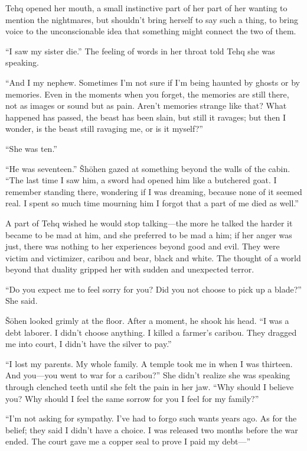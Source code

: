 Tehq opened her mouth, a small instinctive part of her part of her wanting to mention the nightmares, but shouldn't bring herself to say such a thing, to bring voice to the unconscionable idea that something might connect the two of them.

``I saw my sister die.'' The feeling of words in her throat told Tehq she was speaking.

``And I my nephew. Sometimes I'm not sure if I'm being haunted by ghosts or by memories. Even in the moments when you forget, the memories are still there, not as images or sound but as pain. Aren't memories strange like that? What happened has passed, the beast has been slain, but still it ravages; but then I wonder, is the beast still ravaging me, or is it myself?''

``She was ten.''

``He was seventeen.'' Šhōhen gazed at something beyond the walls of the cabin. ``The last time I saw him, a sword had opened him like a butchered goat. I remember standing there, wondering if I was dreaming, because none of it seemed real. I spent so much time mourning him I forgot that a part of me died as well.''

A part of Tehq wished he would stop talking---the more he talked the harder it became to be mad at him, and she preferred to be mad a him; if her anger was just, there was nothing to her experiences beyond good and evil. They were victim and victimizer, caribou and bear, black and white. The thought of a world beyond that duality gripped her with sudden and unexpected terror.

``Do you expect me to feel sorry for you? Did you not choose to pick up a blade?'' She said.

Šōhen looked grimly at the floor. After a moment, he shook his head. ``I was a debt laborer. I didn't choose anything. I killed a farmer's caribou. They dragged me into court, I didn't have the silver to pay.''

``I lost my parents. My whole family. A temple took me in when I was thirteen. And you---you went to war for a caribou?'' She didn't realize she was speaking through clenched teeth until she felt the pain in her jaw. ``Why should I believe you? Why should I feel the same sorrow for you I feel for my family?''

``I'm not asking for sympathy. I've had to forgo such wants years ago. As for the belief; they said I didn't have a choice. I was released two months before the war ended. The court gave me a copper seal to prove I paid my debt---''

